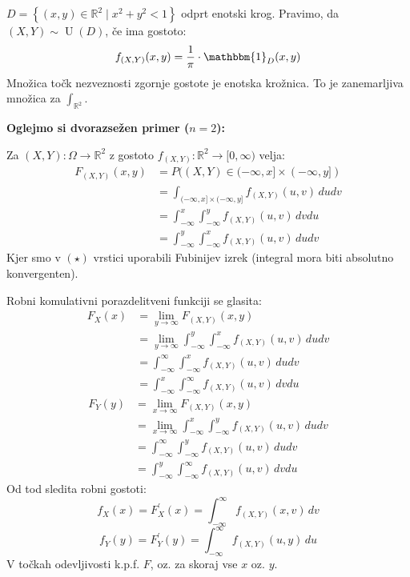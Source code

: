 \documentclass[12pt]{book}
\def\n{\noindent}
\theoremstyle{definition}
\theoremstyle{plain}
\theoremstyle{plain}
\theoremstyle{plain}
\theoremstyle{plain}
\theoremstyle{remark}
\begin{document}
\begin{zgled}
    $D = \left\{(x, y) \in \mathbb{R}^2 \mid x^2+y^2<1\right\}$ odprt enotski krog. Pravimo, da $(X, Y) \sim \operatorname{U}(D)$, če ima gostoto: 
    $$
    f_{(X, Y)}(x, y)=\frac{1}{\pi} \cdot \mathbbm{1}_D(x, y)
    $$
    Množica točk nezveznosti zgornje gostote je enotska krožnica. To je zanemarljiva množica za $\int_{\mathbb{R}^2}$.
\end{zgled}

\n \textbf{Oglejmo si dvorazsežen primer ($n=2$):}

\n Za $(X, Y): \Omega \to \mathbb{R}^2$ z gostoto $f_{(X, Y)}: \mathbb{R}^2 \to [0, \infty)$ velja: 
\begin{align*}
    F_{(X, Y)}(x, y)&=P((X, Y) \in(-\infty, x] \times(-\infty, y]) \\
    &=\int_{(-\infty, x] \times(-\infty, y]} f_{(X, Y)}(u, v) \, d u d v \\
    &=\int_{-\infty}^x \int_{-\infty}^y f_{(X, Y)}(u, v) \, d v d u \tag{$\star$} \\
    &=\int_{-\infty}^y \int_{-\infty}^x f_{(X, Y)}(u, v) \, d u d v
\end{align*}
Kjer smo v $(\star)$ vrstici uporabili Fubinijev izrek (integral mora biti absolutno konvergenten).

\n Robni komulativni porazdelitveni funkciji se glasita: 
$$
\begin{aligned}
    F_X(x)&=\lim _{y \rightarrow \infty} F_{(X, Y)}(x, y) \\
    &=\lim _{y \rightarrow \infty} \int_{-\infty}^y \int_{-\infty}^x f_{(X, Y)}(u, v) \, d u d v \\
    &=\int_{-\infty}^{\infty} \int_{-\infty}^x f_{(X, Y)}(u, v) \,d u d v \\
    &=\int_{-\infty}^x \int_{-\infty}^{\infty} f_{(X, Y)}(u, v) \, d v d u
\end{aligned}
$$
$$
\begin{aligned}
    F_Y(y)&=\lim _{x \rightarrow \infty} F_{(X, Y)}(x, y) \\
    &=\lim _{x \rightarrow \infty} \int_{-\infty}^x \int_{-\infty}^y f_{(X, Y)}(u, v) \, d u d v \\
    &=\int_{-\infty}^{\infty} \int_{-\infty}^y f_{(X, Y)}(u, v) \,d u d v \\
    &=\int_{-\infty}^y \int_{-\infty}^{\infty} f_{(X, Y)}(u, v) \, d v d u
\end{aligned}
$$
Od tod sledita robni gostoti: 
$$
f_X(x)=F_X^{\prime}(x)=\int_{-\infty}^{\infty} f_{(X, Y)}(x, v) \, d v
$$
$$
f_Y(y)=F_Y^{\prime}(y)=\int_{-\infty}^{\infty} f_{(X, Y)}(u, y) \, d u
$$
V točkah odevljivosti k.p.f. $F$, oz. za skoraj vse $x$ oz. $y$. 
\end{document}
